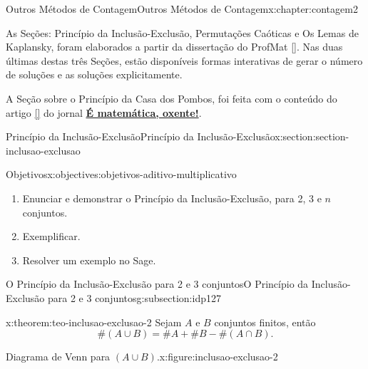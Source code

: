 \documentclass[oneside,10pt,]{book}
\newcommand{\xreffont}{\relax}
\newcommand{\terminology}[1]{\textbf{#1}}
\numberwithin{equation}{section}
\begin{document}
\begin{chapterptx}{Outros Métodos de Contagem}{}{Outros Métodos de Contagem}{}{}{x:chapter:contagem2}
\begin{introduction}{}%
As Seções: Princípio da Inclusão-Exclusão, Permutações Caóticas e Os Lemas de Kaplansky, foram elaborados a partir da dissertação do ProfMat \hyperlink{x:biblio:luiz}{[{\xreffont 6.9}]}. Nas duas últimas destas três Seções, estão disponíveis formas interativas de gerar o número de soluções e as soluções explicitamente.%
\par
A Seção sobre o Princípio da Casa dos Pombos, foi feita com o conteúdo do artigo \hyperlink{x:biblio:oxente01}{[{\xreffont 6.8}]} do jornal \href{http://ematematicaoxente.com.br/}{\terminology{É matemática, oxente!}}.%
\end{introduction}%
%
%
\typeout{************************************************}
\typeout{************************************************}
%
\begin{sectionptx}{Princípio da Inclusão-Exclusão}{}{Princípio da Inclusão-Exclusão}{}{}{x:section:section-inclusao-exclusao}
\begin{objectives}{Objetivos}{x:objectives:objetivos-aditivo-multiplicativo}
%
\begin{enumerate}
\item{}Enunciar e demonstrar o Princípio da Inclusão-Exclusão, para 2, 3 e \(n\) conjuntos.%
\item{}Exemplificar.%
\item{}Resolver um exemplo no Sage.%
\end{enumerate}
\end{objectives}
%
%
\typeout{************************************************}
\typeout{************************************************}
%
\begin{subsectionptx}{O Princípio da Inclusão-Exclusão para 2 e 3 conjuntos}{}{O Princípio da Inclusão-Exclusão para 2 e 3 conjuntos}{}{}{g:subsection:idp127}
\begin{theorem}{}{}{x:theorem:teo-inclusao-exclusao-2}%
Sejam  \(A\)  e  \(B\)  conjuntos finitos, então%
\begin{equation*}
\#(A\cup B) = \#A + \# B - \#(A\cap B). 
\end{equation*}
%
\begin{figureptx}{Diagrama de Venn para \((A\cup B)\).}{x:figure:inclusao-exclusao-2}{}%
\begin{image}{0.35}{0.3}{0.35}%

\end{image}
\end{figureptx}
\end{theorem}
\end{subsectionptx}
\end{sectionptx}
\end{chapterptx}
\end{document}

